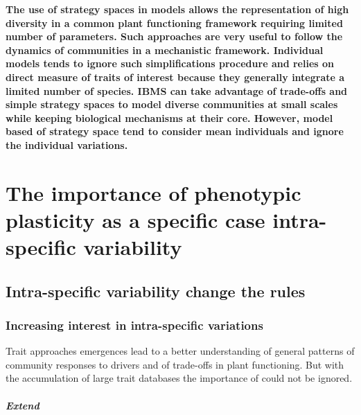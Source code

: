 \textbf{The use of strategy spaces in models allows the representation of high diversity in a common plant functioning framework requiring limited number of parameters. Such approaches are very useful to follow the dynamics of communities in a mechanistic framework. Individual models tends to ignore such simplifications procedure and relies on direct measure of traits of interest because they generally integrate a limited number of species. IBMS can take advantage of trade-offs and simple strategy spaces to model diverse communities at small scales while keeping biological mechanisms at their core. However, model based of strategy space tend to consider mean individuals and ignore the individual variations.}


\chapter{The importance of phenotypic plasticity as a specific case intra-specific variability}

\section{Intra-specific variability change the rules}


\subsection{Increasing interest in intra-specific variations}

Trait approaches emergences lead to a better understanding of general patterns of community responses to drivers and of trade-offs in plant functioning. But with the accumulation of large trait databases the importance of  could not be ignored.

\paragraph{Extend}


